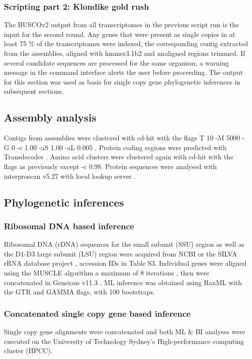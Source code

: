 \documentclass[12pt]{article}
\begin{document}
\subsubsection*{Scripting part 2: Klondike gold rush}
The BUSCOv2 output from all transcriptomes in the previous script run is the input for the second round. 
Any genes that were present as single copies in at least 75 \% of the transcriptomes were indexed, the corresponding contig extracted from the assemblies, aligned with hmmer3.1b2 \cite{eddy2015hmmer} and unaligned regions trimmed.
If several candidate sequences are processed for the same organism, a warning message in the command interface alerts the user before proceeding. 
The output for this section was used as basis for single copy gene phylogenetic inferences in subsequent sections.

\subsection*{Assembly analysis}
Contigs from assemblies were clustered with cd-hit with the flags T 10 -M 5000 -G 0 -c 1.00 -aS 1.00 -aL 0.005 \cite{fu2012cd}. 
Protein coding regions were predicted with Transdecoder \cite{haas2016transdecoder}.
Amino acid clusters were clustered again with cd-hit with the flags as previously except -c 0.98.
Protein sequences were analysed with interproscan v5.27 with local lookup server \cite{quevillon2005interproscan}.

\subsection*{Phylogenetic inferences}
\subsubsection*{Ribosomal DNA based inference}
Ribosomal DNA (rDNA) sequences for the small subunit (SSU) region as well as the D1-D3 large subunit (LSU) region were acquired from NCBI \cite{coordinators2017database} or the SILVA rRNA database project \cite{silvaproj}, accession IDs in Table S3. 
Individual genes were aligned using the MUSCLE algorithm a maximum of 8 iterations \cite{edgar2004muscle}, then were concatenated in Geneious v11.3 \cite{kearse2012geneious}.
ML inference was obtained using RaxML \cite{stamatakis2014raxml} with the GTR and GAMMA flags, with 100 bootstraps.

\subsubsection*{Concatenated single copy gene based inference}
Single copy gene alignments were concatenated and both ML \& BI analyses were executed on the University of Technology Sydney's High-performance computing cluster (HPCC).
\end{document}
